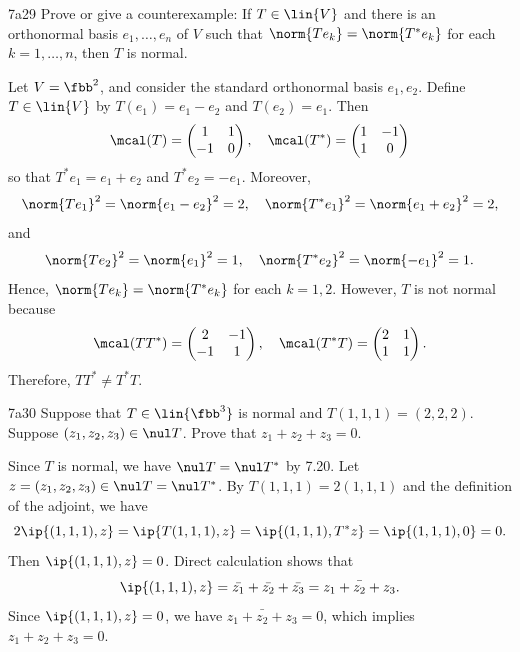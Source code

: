 \begin{exercise}{7a29}
    Prove or give a counterexample: If $T \in \lin{V}$ and there is an orthonormal basis $e_1, \ldots, e_n$ of $V$ such that $\norm{Te_k} = \norm{T^\ast e_k}$ for each $k = 1, \ldots, n$, then $T$ is normal.
\end{exercise}

\begin{sol}
    Let $V = \fbb^2$, and consider the standard orthonormal basis $e_1, e_2$.
    Define $T \in \lin{V}$ by $T(e_1) = e_1 - e_2$ and $T(e_2) = e_1$.
    Then
    \[
        \mcal(T) = 
        \begin{pmatrix}
            1 & 1 \\
            -1 & 0 \\
        \end{pmatrix}, \quad
        \mcal(T^\ast) = 
        \begin{pmatrix}
            1 & -1 \\
            1 & 0 \\
        \end{pmatrix}
    \]
    so that $T^\ast e_1 = e_1 + e_2$ and $T^\ast e_2 = -e_1$.
    Moreover,
    \[
        \norm{Te_1}^2 = \norm{e_1 - e_2}^2 = 2, \quad \norm{T^\ast e_1}^2 = \norm{e_1 + e_2}^2 = 2,
    \]
    and
    \[
        \norm{Te_2}^2 = \norm{e_1}^2 = 1, \quad \norm{T^\ast e_2}^2 = \norm{-e_1}^2 = 1.
    \]
    Hence, $\norm{Te_k} = \norm{T^\ast e_k}$ for each $k = 1, 2$.
    However, $T$ is not normal because
    \[
        \mcal(TT^\ast) =
        \begin{pmatrix}
            2 & -1 \\
            -1 & 1 \\
        \end{pmatrix}, \quad
        \mcal(T^\ast T) =
        \begin{pmatrix}
            2 & 1 \\
            1 & 1
        \end{pmatrix}.
    \]
    Therefore, $TT^\ast \neq T^\ast T$.
\end{sol}

\begin{exercise}{7a30}
    Suppose that $T \in \lin{\fbb^3}$ is normal and $T(1, 1, 1) = (2, 2, 2)$.
    Suppose $(z_1, z_2, z_3) \in \nul T$.
    Prove that $z_1 + z_2 + z_3 = 0$.
\end{exercise}

\begin{sol}
    Since $T$ is normal, we have $\nul T = \nul T^\ast$ by 7.20.
    Let $z = (z_1, z_2, z_3) \in \nul T = \nul T^\ast$.
    By $T(1, 1, 1) = 2(1, 1, 1)$ and the definition of the adjoint, we have
    \[
        2\ip{(1, 1, 1), z} = \ip{T(1, 1, 1), z} = \ip{(1, 1, 1), T^\ast z} = \ip{(1, 1, 1), 0} = 0.
    \]
    Then $\ip{(1, 1, 1), z} = 0$.
    Direct calculation shows that
    \[
        \ip{(1, 1, 1), z} = \bar{z_1} + \bar{z_2} + \bar{z_3} = \bar{z_1 + z_2 + z_3}.
    \]
    Since $\ip{(1, 1, 1), z} = 0$, we have $\bar{z_1 + z_2 + z_3} = 0$, which implies $z_1 + z_2 + z_3 = 0$.
\end{sol}

